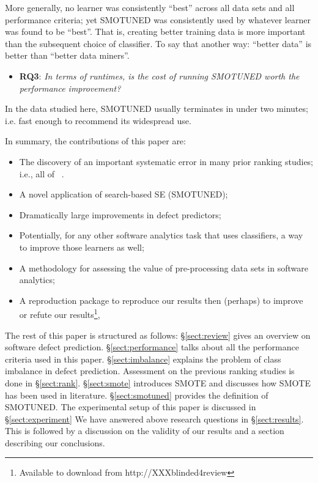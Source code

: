 \documentclass[10pt,conference]{IEEEtran}
\newcommand{\bi}{\begin{itemize}[leftmargin=0.4cm]}
\newcommand{\ei}{\end{itemize}}
\theoremstyle{break}
\theoremstyle{break}
\newcommand{\tion}[1]{{\S}\ref{sect:#1}}
\newcommand{\sma}{{\sc SMOTE}}
\newcommand{\smb}{{\sc SMOTUNED}}
\begin{document}
More generally, no learner was consistently ``best'' across all data sets and all performance criteria; yet {\smb} was consistently  used by  whatever  learner was found to be ``best''.  
That is,  creating better training data is more important
than the subsequent choice of classifier.  To say that another way: ``better data'' is better than ``better data miners''.
 
  
   \bi
  \item
  \textbf{RQ3}: {\em  In terms of runtimes, is the cost of running SMOTUNED worth the performance improvement?}
  \ei
  
   \begin{lesson}In the data studied here,
   SMOTUNED usually terminates in under two minutes; i.e.  fast enough
   to recommend its widespread use.
 \end{lesson}


\newpage
\noindent
In summary, the  contributions of this paper are:
\bi
\item The discovery of an important systematic error in  many prior ranking studies; i.e., all of
~\cite{lessmann2008benchmarking,hall2012systematic,elish2008predicting,menzies2010defect,gondra2008applying,radjenovic2013software,jiang2008techniques,wang2013using,mende2009revisiting,li2012sample,khoshgoftaar2010attribute,jiang2009variance,ghotra2015revisiting,jiang2008can,tantithamthavorn2016automated,fu2016tuning}.
\item A novel application of search-based SE ({\smb});
\item Dramatically large improvements in  defect predictors;
\item Potentially, for any other software analytics task that uses classifiers, a way to improve those learners as well;
\item A methodology for assessing the value of pre-processing data sets in software analytics;
\item A reproduction package to reproduce our results then (perhaps) to improve or refute  our results\footnote{Available to download from http://XXXblinded4review},
\ei
The rest of this paper is structured as follows:
\tion{review} gives an overview on software defect prediction.
\tion{performance} talks about all the performance criteria used in this paper.
\tion{imbalance} explains the problem of class imbalance in defect prediction. Assessment on the previous ranking studies is done in \tion{rank}.
\tion{smote} introduces {\sma} and discusses how {\sma} has been used in literature. \tion{smotuned} provides the definition of {\smb}. The experimental setup of this paper is discussed in \tion{experiment}
We have answered above research questions in
\tion{results}. This is followed by a discussion on the validity of our results 
and a section describing our conclusions.
 
\end{document}
